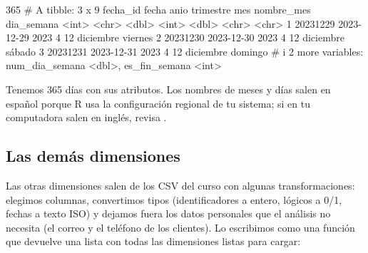 \begin{rsalida}
[1] 365
# A tibble: 3 x 9
  fecha_id fecha       anio trimestre   mes nombre_mes dia_semana
     <int> <chr>      <dbl>     <int> <dbl> <chr>      <chr>     
1 20231229 2023-12-29  2023         4    12 diciembre  viernes   
2 20231230 2023-12-30  2023         4    12 diciembre  sábado    
3 20231231 2023-12-31  2023         4    12 diciembre  domingo   
# i 2 more variables: num_dia_semana <dbl>, es_fin_semana <int>
\end{rsalida}

Tenemos 365 días con sus atributos. Los nombres de meses y días salen en
español porque R usa la configuración regional de tu sistema; si en tu
computadora salen en inglés, revisa .

\subsection{Las demás dimensiones}

Las otras dimensiones salen de los CSV del curso con algunas
transformaciones: elegimos columnas, convertimos tipos (identificadores a
entero, lógicos a 0/1, fechas a texto ISO) y dejamos fuera los datos
personales que el análisis no necesita (el correo y el teléfono de los
clientes). Lo escribimos como una función que devuelve una lista con todas
las dimensiones listas para cargar:

